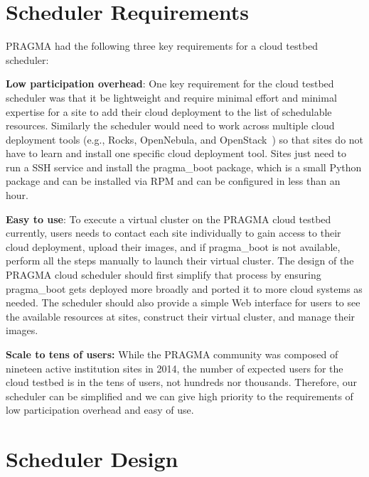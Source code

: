 \documentclass{acm_proc_article-sp}
\begin{document}
\section{Scheduler Requirements}

PRAGMA had the following three key requirements for a cloud testbed scheduler:

\textbf{Low participation overhead}:  One key requirement for the cloud testbed scheduler was that it be lightweight and require  minimal effort and minimal expertise for a site to add their cloud deployment to the list of schedulable resources.   Similarly the scheduler would need to work across multiple cloud deployment tools (e.g., Rocks, OpenNebula, and OpenStack~\cite{openstack}) so that sites do not have to learn and install one specific cloud deployment tool.  Sites  just need to run a SSH service and install the pragma\_boot package, which is a small Python package and can be installed via RPM and can be configured in less than an hour.

\textbf{Easy to use}:  To execute a virtual cluster on the PRAGMA cloud testbed currently, users needs to contact each site individually to gain access to their cloud deployment, upload their images, and if pragma\_boot is not available, perform all the steps manually to launch their virtual cluster.   The design of the PRAGMA cloud scheduler should first simplify that process by ensuring pragma\_boot gets deployed more broadly and ported it to more cloud systems as needed.   The scheduler should also provide a simple Web interface for users to see the available resources at sites, construct their virtual cluster, and manage their images.

\textbf{Scale to tens of users:}  While the PRAGMA community was composed of nineteen active institution sites in 2014, the number of expected users for the cloud testbed is in the tens of users, not hundreds nor thousands.  Therefore, our scheduler can be simplified and we can give high priority to the requirements of low participation overhead and easy of use.


\section{Scheduler Design}
\label{Sec:Design}
\end{document}
